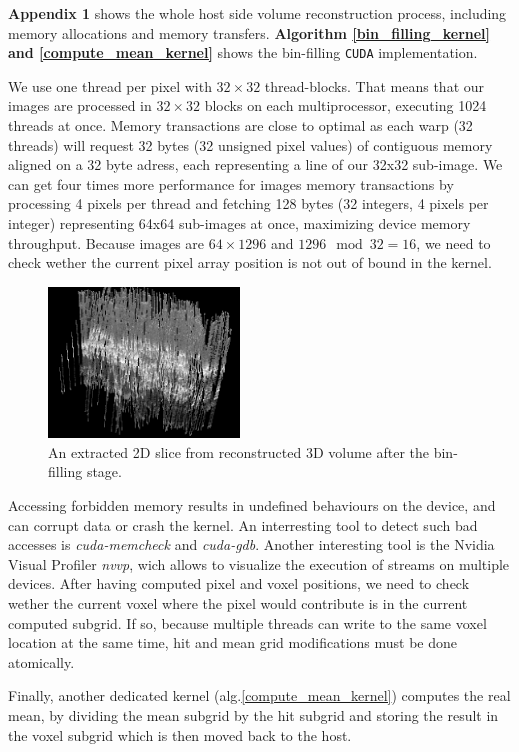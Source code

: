 \documentclass[12pt,journal,compsoc]{IEEEtran}
\begin{document}
\textbf{Appendix 1} shows the whole host side volume reconstruction process, including memory allocations and memory transfers. 
\textbf{Algorithm \ref{bin_filling_kernel} and \ref{compute_mean_kernel}} shows the bin-filling \texttt{CUDA} implementation.

We use one thread per pixel with $32\times 32$ thread-blocks.
That means that our images are processed in $32\times 32$ blocks on each multiprocessor, executing 1024 threads at once.
Memory transactions are close to optimal as each warp (32 threads) will request 32 bytes (32 unsigned pixel values) of contiguous memory aligned on a 32 byte adress, each representing a line of our 32x32 sub-image.
We can get four times more performance for images memory transactions by processing 4 pixels per thread and fetching 128 bytes (32 integers, 4 pixels per integer) representing 64x64 sub-images at once, maximizing device memory throughput.
Because images are $64\times 1296$ and $1296 \mod{32} = 16$, we need to check wether the current pixel array position is not out of bound in the kernel.

\begin{figure}[hb!]
\centering
\includegraphics[width=2.0in]{pnn_slice}%
\caption{An extracted 2D slice from reconstructed 3D volume after the bin-filling stage.}
\label{extracted_pnn_slice}
\end{figure}

Accessing forbidden memory results in undefined behaviours on the device, and can corrupt data or crash the kernel.
An interresting tool to detect such bad accesses is \textit{cuda-memcheck} and \textit{cuda-gdb}.
Another interesting tool is the Nvidia Visual Profiler \textit{nvvp}, wich allows to visualize the execution of streams on multiple devices.
After having computed pixel and voxel positions, we need to check wether the current voxel where the pixel would contribute is in the current computed subgrid. 
If so, because multiple threads can write to the same voxel location at the same time, hit and mean grid modifications must be done atomically.\par
Finally, another dedicated kernel (alg.\ref{compute_mean_kernel}) computes the real mean, by dividing the mean subgrid by the hit subgrid and storing the result in the voxel subgrid which is then moved back to the host.
\end{document}

